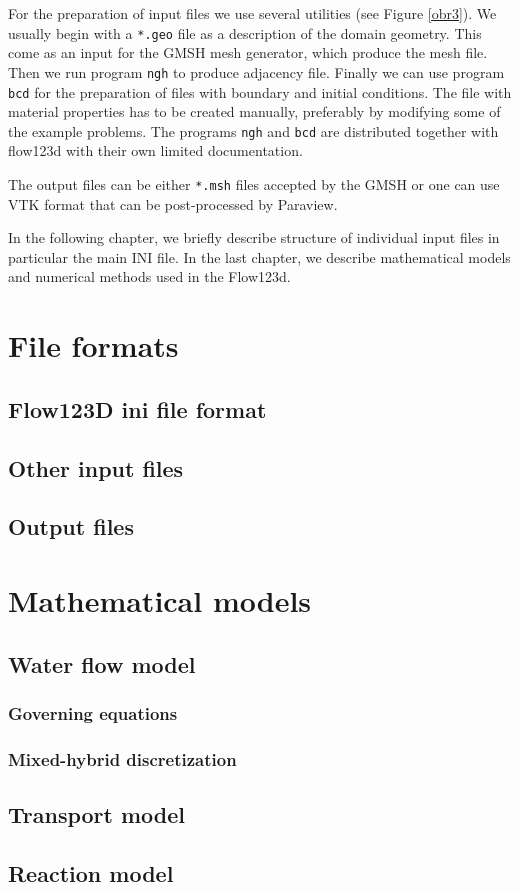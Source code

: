 \documentclass[12pt,a4paper]{report}
\begin{document}
For the preparation of input files we use several utilities (see Figure \ref{obr3}). 
We usually begin with a \verb'*.geo' file as a description of the domain geometry. This come as an input for the GMSH mesh generator, which produce 
the mesh file. Then we run program \verb'ngh' to produce adjacency file. Finally we can use program \verb'bcd' for the preparation of files with
boundary and initial conditions. The file with material properties has to be created manually, preferably by modifying some of the example problems.
The programs \verb'ngh' and \verb'bcd' are distributed together with flow123d with their own limited documentation.

The output files can be either \verb'*.msh' files accepted by the GMSH or one can use VTK format that can be post-processed by Paraview.

In the following chapter, we briefly describe structure of individual input files in particular the main INI file. In the last chapter, we describe
mathematical models and numerical methods used in the Flow123d.


\chapter{File formats}
\section{Flow123D ini file format}



\section{Other input files}



\section{Output files}

% 
%   


\chapter{Mathematical models}
\section{Water flow model}
\subsection{Governing equations}
\subsection{Mixed-hybrid discretization}

\section{Transport model}


\section{Reaction model}


\end{document}
